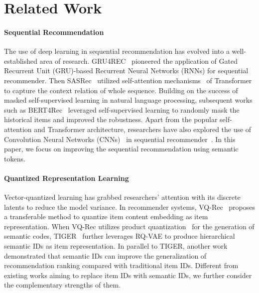 

\section{Related Work}


\paragraph{\textbf{Sequential Recommendation}} The use of deep learning in sequential recommendation has evolved into a well-established area of research. GRU4REC~\citep{gru4rec} pioneered the application of Gated Recurrent Unit (GRU)-based Recurrent Neural Networks (RNNs) for sequential recommender. Then SASRec~\citep{sasrec} utilized self-attention mechanisms~\cite{vaswani2017attention} of Transformer to capture the context relation of whole sequence. Building on the success of masked self-supervised learning in natural language processing, subsequent works such as BERT4Rec~\citep{bert4rec} leveraged self-supervised learning to randomly mask the historical items and improved the robustness. Apart from the popular self-attention and Transformer architecture, researchers have also explored the use of Convolution Neural Networks (CNNs)~\citep{CNN} in sequential recommender~\citep{caser}. In this paper, we focus on improving the sequential recommendation using semantic tokens.

\paragraph{\textbf{Quantized Representation Learning}} Vector-quantized learning has grabbed researchers' attention with its discrete latents to reduce the model variance. In recommender systems, VQ-Rec~\citep{vqrec} proposes a transferable method to quantize item content embedding as item representation. When VQ-Rec utilizes product quantization~\citep{jegou2010product} for the generation of semantic codes, TIGER~\citep{rajput2024recommender} further leverages RQ-VAE to produce hierarchical semantic IDs as item representation. In parallel to TIGER, another work~\citep{singh2023better} demonstrated that semantic IDs can improve the generalization of recommendation ranking compared with traditional item IDs. Different from existing works aiming to replace item IDs with semantic IDs, we further consider the complementary strengths of them.

 





